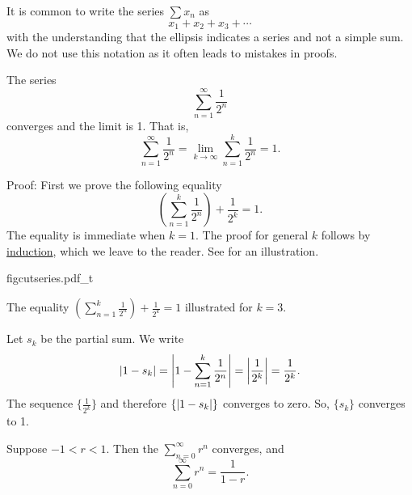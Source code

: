 \begin{remark}
It is common to write the series $\sum x_n$ as
\begin{equation*}
x_1 + x_2 + x_3 + \cdots
\end{equation*}
with the understanding that the ellipsis indicates a series and
not a simple sum.  We do not use this notation as it often leads to 
mistakes in proofs.
\end{remark}

\begin{example}
The series
\begin{equation*}
\sum_{n=1}^\infty \frac{1}{2^n}
\end{equation*}
converges and the limit is 1.  That is,
\begin{equation*}
\sum_{n=1}^\infty \frac{1}{2^n} = 
\lim_{k\to\infty} \sum_{n=1}^k \frac{1}{2^n} = 
1 .
\end{equation*}

Proof: First we prove the following equality
\begin{equation*}
\left( \sum_{n=1}^k \frac{1}{2^n} \right)
+ \frac{1}{2^k}
= 1 .
\end{equation*}
The equality is immediate when $k=1$.  The proof for general $k$
follows by \hyperref[induction:thm]{induction}, which we leave to the
reader.  See  for an illustration.
\begin{myfigureht}
{figcutseries.pdf_t}
\caption{The equality 
$\left( \sum_{n=1}^k \frac{1}{2^n} \right)
+ \frac{1}{2^k}
= 1$ illustrated for $k=3$.\label{figcutseries}}
\end{myfigureht}

Let $s_k$ be the partial sum.  We write
\begin{equation*}
\left\lvert {
1 - s_k 
} \right\rvert
=
\left\lvert {
1 - 
\sum_{n=1}^k \frac{1}{2^n}
} \right\rvert
=
\left\lvert {\frac{1}{2^k}} \right\rvert = 
\frac{1}{2^k} .
\end{equation*}
The sequence $\{ \frac{1}{2^k} \}$ and therefore $\{ \left\lvert {1-s_k} \right\rvert \}$
converges to zero.  So, $\{ s_k \}$ converges to 1.
\end{example}

\begin{prop} \label{geometric:prop}
Suppose
$-1 < r < 1$.  Then the \emph{}
$\sum_{n=0}^\infty r^n$ converges, and
\begin{equation*}
\sum_{n=0}^\infty r^n = \frac{1}{1-r} .
\end{equation*}
\end{prop}

